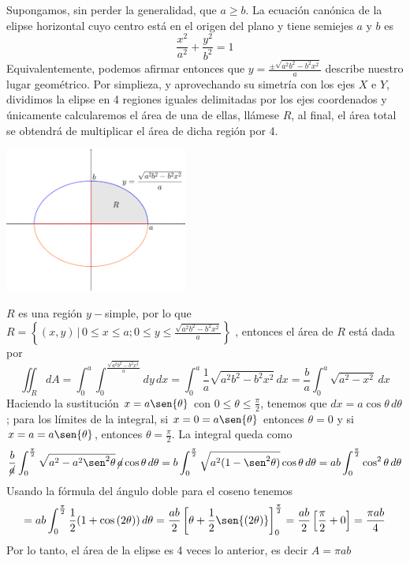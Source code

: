 \documentclass{article}
\begin{document}
\begin{enumerate}
{        Supongamos, sin perder la generalidad, que $a\geq b$. La ecuación canónica de la elipse horizontal cuyo centro está en el origen del plano y tiene semiejes $a$ y $b$ es
        \[
            \frac{x^2}{a^2}+\frac{y^2}{b^2}=1
        \]
        Equivalentemente, podemos afirmar entonces que
        \(\displaystyle
            y=\frac{\pm\sqrt{a^2 b^2 -b^2 x^2}}{a}
        \)
        describe nuestro lugar geométrico. Por simplieza, y aprovechando su simetría con los ejes $X$ e $Y$, dividimos la elipse en 4 regiones iguales delimitadas por los ejes coordenados y únicamente calcularemos el área de una de ellas, llámese $R$, al final, el área total se obtendrá de multiplicar el área de dicha región por 4.
        \begin{center}
            \includegraphics[width=6cm]{img/ej4.png}
        \end{center}
        $R$ es una región $y-$simple, por lo que
        \(\displaystyle
            R=\left\{
                (x,y)\,\bigg\vert\,
                0\leq x\leq a;
                0\leq y\leq\frac{\sqrt{a^2b^2-b^2x^2}}{a}
            \right\}
        \)
        , entonces el área de $R$ está dada por
        \[
            \iint_R{dA}
            =\int_0^a{\int_0^{ \frac{\sqrt{a^2b^2-b^2x^2}}{a} }{dy}\,dx}
            =\int_0^a{\frac{1}{a}\sqrt{a^2b^2-b^2x^2}\,dx}
            =\frac{b}{a}\int_0^a{\sqrt{a^2-x^2}\,dx}
        \]
        Haciendo la sustitución $x=a \sen{\theta}$ con $0\leq\theta\leq\frac{\pi}{2}$, tenemos que $dx=a\cos{\theta}\,d\theta$; para los límites de la integral, si $x=0=a\sen{\theta}$ entonces $\theta=0$ y si $x=a=a\sen{\theta}$, entonces $\theta=\frac{\pi}{2}$. La integral queda como
        \[
            \frac{b}{\cancel{a}}\int_0^{\frac{\pi}{2}}{
                \sqrt{a^2-a^2\sen^2{\theta}}\,\cancel{a}\cos{\theta}\,d\theta
            }
            =b\int_0^{\frac{\pi}{2}}{
                \sqrt{a^2(1-\sen^2{\theta})}\cos{\theta}\,d\theta
            }
            =ab\int_0^{\frac{\pi}{2}}{
                \cos^2{\theta}\,d\theta
            }
        \]
        Usando la fórmula del ángulo doble para el coseno tenemos
        \[
            =ab\int_0^\frac{\pi}{2}{
                \frac{1}{2}(1+\cos{(2\theta)})
            \,d\theta}
            =\frac{ab}{2}\left[
                \theta + \frac{1}{2}\sen{(2\theta)}
            \right]_0^\frac{\pi}{2}
            =\frac{ab}{2}\left[
                \frac{\pi}{2}+0
            \right]
            =\frac{\pi ab}{4}
        \]
        Por lo tanto, el área de la elipse es 4 veces lo anterior, es decir $A=\pi ab$
	}


\end{enumerate}
\end{document}
